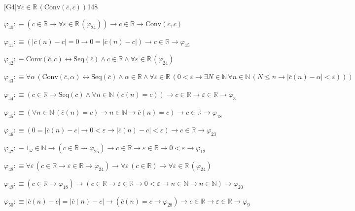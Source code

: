 \begin{fullproof}{[G4]}{$\forall c \in \mathbb{R}\,(\mathrm{Conv}(\overline{c},c))$}{148}
\begin{abbrevlist}
\item $\varphi_{40} :\equiv (c \in \mathbb{R} \to \forall \varepsilon \in \mathbb{R}\,(\varphi_{24})) \to c \in \mathbb{R} \to \mathrm{Conv}(\overline{c},c)$
\item $\varphi_{41} :\equiv (\lvert \overline{c}(n) - c \rvert = 0 \to 0 = \lvert \overline{c}(n) - c \rvert) \to c \in \mathbb{R} \to \varphi_{15}$
\item $\varphi_{42} :\equiv \mathrm{Conv}(\overline{c},c) \leftrightarrow \mathrm{Seq}(\overline{c}) \land c \in \mathbb{R} \land \forall \varepsilon \in \mathbb{R}\,(\varphi_{24})$
\item $\varphi_{43} :\equiv \forall \alpha\,(\mathrm{Conv}(\overline{c},\alpha) \leftrightarrow \mathrm{Seq}(\overline{c}) \land \alpha \in \mathbb{R} \land \forall \varepsilon \in \mathbb{R}\,(0 < \varepsilon \to \exists N \in \mathbb{N}\,\forall n \in \mathbb{N}\,(N \leq n \to \lvert \overline{c}(n) - \alpha \rvert < \varepsilon)))$
\item $\varphi_{44} :\equiv (c \in \mathbb{R} \to \mathrm{Seq}(\overline{c}) \land \forall n \in \mathbb{N}\,(\overline{c}(n) = c)) \to c \in \mathbb{R} \to \varepsilon \in \mathbb{R} \to \varphi_{3}$
\item $\varphi_{45} :\equiv (\forall n \in \mathbb{N}\,(\overline{c}(n) = c) \to n \in \mathbb{N} \to \overline{c}(n) = c) \to c \in \mathbb{R} \to \varphi_{18}$
\item $\varphi_{46} :\equiv (0 = \lvert \overline{c}(n) - c \rvert \to 0 < \varepsilon \to \lvert \overline{c}(n) - c \rvert < \varepsilon) \to c \in \mathbb{R} \to \varphi_{23}$
\item $\varphi_{47} :\equiv 1_{\omega} \in \mathbb{N} \to (c \in \mathbb{R} \to \varphi_{25}) \to c \in \mathbb{R} \to \varepsilon \in \mathbb{R} \to 0 < \varepsilon \to \varphi_{12}$
\item $\varphi_{48} :\equiv \forall \varepsilon\,(c \in \mathbb{R} \to \varepsilon \in \mathbb{R} \to \varphi_{24}) \to \forall \varepsilon\,(c \in \mathbb{R}) \to \forall \varepsilon \in \mathbb{R}\,(\varphi_{24})$
\item $\varphi_{49} :\equiv (c \in \mathbb{R} \to \varphi_{18}) \to (c \in \mathbb{R} \to \varepsilon \in \mathbb{R} \to 0 < \varepsilon \to n \in \mathbb{N} \to n \in \mathbb{N}) \to \varphi_{20}$
\item $\varphi_{50} :\equiv \lvert \overline{c}(n) - c \rvert = \lvert \overline{c}(n) - c \rvert \to (\overline{c}(n) = c \to \varphi_{28}) \to c \in \mathbb{R} \to \varepsilon \in \mathbb{R} \to \varphi_{9}$

\end{abbrevlist}
\end{fullproof}

